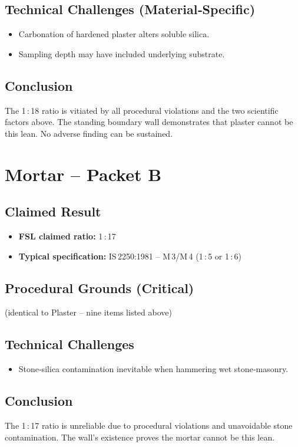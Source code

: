 \documentclass[12pt]{article}
\begin{document}
\subsection*{Technical Challenges (Material‑Specific)}
\begin{itemize}
  \item Carbonation of hardened plaster alters soluble silica.
  \item Sampling depth may have included underlying substrate.
\end{itemize}

\subsection*{Conclusion}
The 1 : 18 ratio is vitiated by all procedural violations and the two scientific factors above. The standing boundary wall demonstrates that plaster cannot be this lean. No adverse finding can be sustained.

\section*{Mortar – Packet B}
\subsection*{Claimed Result}
\begin{itemize}[nosep]
  \item \textbf{FSL claimed ratio:} 1 : 17
  \item \textbf{Typical specification:} IS 2250:1981 – M 3/M 4 (1 : 5 or 1 : 6)
\end{itemize}

\subsection*{Procedural Grounds (Critical)}
(identical to Plaster – nine items listed above)

\subsection*{Technical Challenges}
\begin{itemize}
  \item Stone‑silica contamination inevitable when hammering wet stone‑masonry.
\end{itemize}

\subsection*{Conclusion}
The 1 : 17 ratio is unreliable due to procedural violations and unavoidable stone contamination. The wall’s existence proves the mortar cannot be this lean.
\end{document}
